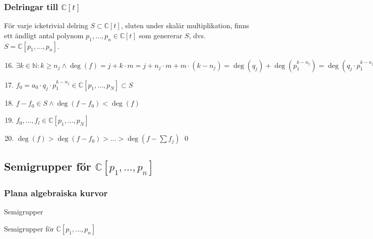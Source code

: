 \documentclass{beamer}
\begin{document}
\begin{frame}
	\frametitle{Delringar till $\mathbb{C}[t]$}
	\begin{Theorem}
		För varje icketrivial delring $S \subset \mathbb{C}[t]$, sluten under skalär multiplikation, finns ett ändligt antal polynom $p_1,\ldots,p_n \in \mathbb{C}[t]$ som genererar $S$, dvs. $S=\mathbb{C}[p_1,\ldots,p_n]$.
	\end{Theorem}
	
	\begin{enumerate}
		\setcounter{enumi}{15}
		\item<1->$\exists k \in \mathbb{N} : k\geq n_j \wedge \deg(f) = j + k\cdot m = j + n_j\cdot m + m\cdot(k-n_j) =\deg(q_j)+\deg(p_1^{k-n_j}) = \deg(q_j\cdot p_1^{k-n_j})$
		\item<2->$f_0 = a_0\cdot q_j\cdot p_1^{k-n_j} \in \mathbb{C}[p_1,\ldots,p_N] \subset S$
		\item<3->$f-f_0 \in S \wedge \deg(f-f_0)<\deg(f)$
		\item<4->$f_0,\ldots,f_l \in \mathbb{C}[p_1,\ldots,p_N]$
		\item<5->$\deg(f)>\deg(f-f_0)>\ldots>\deg(f-\sum f_j)$
		\qed
	\end{enumerate}
\end{frame}



\subsection{Semigrupper för $\mathbb{C}[p_1,\ldots,p_n]$}

\begin{frame}
	\frametitle{Plana algebraiska kurvor}
	\begin{center}
		\Large Semigrupper
		
		Semigrupper för $\mathbb{C}[p_1,\ldots,p_n]$
	\end{center}
\end{frame}
\end{document}
